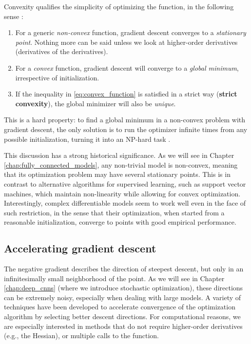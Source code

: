 Convexity qualifies the simplicity of optimizing the function, in the following sense \cite{jain2017non}:
%
\begin{enumerate}
    \item For a generic \textit{non-convex} function, gradient descent converges to a \textit{stationary point}. Nothing more can be said unless we look at higher-order derivatives (derivatives of the derivatives).
    \item For a \textit{convex} function, gradient descent will converge to a \textit{global minimum}, irrespective of initialization.
    \item  If the inequality in \eqref{eq:convex_function} is satisfied in a strict way (\textbf{strict convexity}), the global minimizer will also be \textit{unique}.
\end{enumerate}

This is a hard property: to find a global minimum in a non-convex problem with gradient descent, the only solution is to run the optimizer infinite times from any possible initialization, turning it into an NP-hard task \cite{jain2017non}.

This discussion has a strong historical significance. As we will see in Chapter \ref{chap:fully_connected_models}, any non-trivial model is non-convex, meaning that its optimization problem may have several stationary points. This is in contrast to alternative algorithms for supervised learning, such as support vector machines, which maintain non-linearity while allowing for convex optimization. Interestingly, complex differentiable models seem to work well even in the face of such restriction, in the sense that their optimization, when started from a reasonable initialization, converge to points with good empirical performance.

\subsection{Accelerating gradient descent}
The negative gradient describes the direction of steepest descent, but only in an infinitesimally small neighborhood of the point. As we will see in Chapter \ref{chap:deep_cnns} (where we introduce stochastic optimization), these directions can be extremely noisy, especially when dealing with large models. A variety of techniques have been developed to accelerate convergence of the optimization algorithm by selecting better descent directions. For computational reasons, we are especially interested in methods that do not require higher-order derivatives (e.g., the Hessian), or multiple calls to the function.


